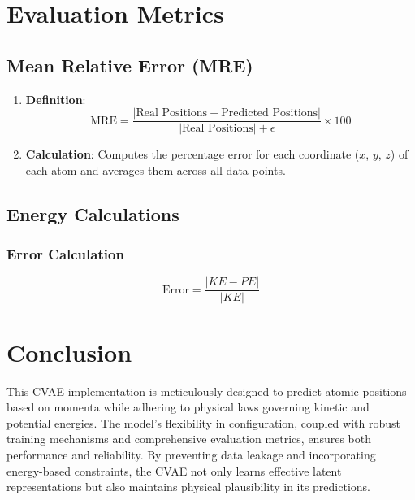 \documentclass[12pt]{article}
\begin{document}
\section{Evaluation Metrics}

\subsection{Mean Relative Error (MRE)}

\begin{enumerate}[label=\alph*.]
    \item \textbf{Definition}:
    \[
    \text{MRE} = \frac{|\text{Real Positions} - \text{Predicted Positions}|}{|\text{Real Positions}| + \epsilon} \times 100
    \]
    \item \textbf{Calculation}: Computes the percentage error for each coordinate (\( x \), \( y \), \( z \)) of each atom and averages them across all data points.
\end{enumerate}


\subsection{Energy Calculations}



\subsubsection{Error Calculation}

\[
\text{Error} = \frac{|KE - PE|}{|KE|}
\]


\section{Conclusion}

This CVAE implementation is meticulously designed to predict atomic positions based on momenta while adhering to physical laws governing kinetic and potential energies. The model's flexibility in configuration, coupled with robust training mechanisms and comprehensive evaluation metrics, ensures both performance and reliability. By preventing data leakage and incorporating energy-based constraints, the CVAE not only learns effective latent representations but also maintains physical plausibility in its predictions.
\end{document}
